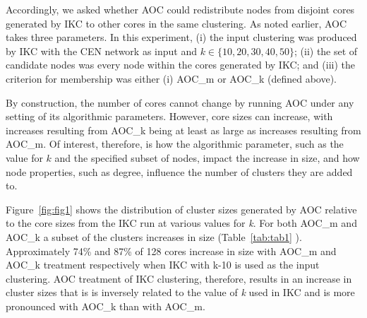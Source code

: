 \documentclass[12pt, oneside]{article}   	%
\begin{document}
Accordingly, we asked whether AOC could redistribute nodes from disjoint cores generated by IKC to other cores in the same clustering. As noted earlier, AOC takes three parameters. In this experiment, (i) the input clustering was produced by IKC with the CEN network as input and $k \in \{10, 20, 30, 40, 50\}$; (ii) the set of candidate nodes was every node within the cores generated by IKC; and (iii) the criterion for membership was either (i) AOC\_m or AOC\_k (defined above).

By construction, the number of cores cannot change by running AOC  under any setting of its algorithmic parameters. However, core sizes can increase, with increases resulting from AOC\_k being at least as large as increases resulting from AOC\_m.
Of interest, therefore, is how the algorithmic parameter, such as the value for $k$ and the specified subset of nodes, impact the increase in size, and how node properties, such as degree, influence the number of clusters they are added to.

Figure~\ref{fig:fig1} shows the distribution of cluster sizes generated by AOC relative to the core sizes from the IKC run at various values for \emph{k}. For both AOC\_m and AOC\_k a subset of the clusters increases in size (Table~\ref{tab:tab1} ).
Approximately 74\% and 87\% of  128 cores increase in size with AOC\_m and AOC\_k treatment respectively when IKC with k-10 is used as the input clustering. AOC treatment of IKC clustering, therefore, results in an increase in cluster sizes that is is inversely related to the value of \emph{k} used in IKC and is more pronounced with AOC\_k than with AOC\_m. 
\end{document}
